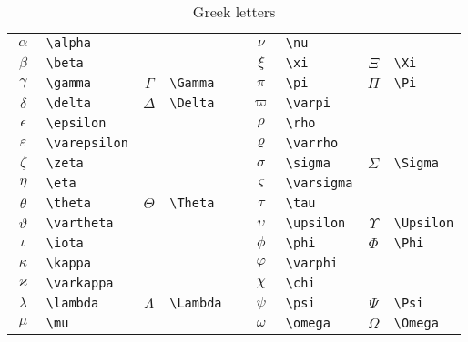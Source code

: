\documentclass[captions=tableheading]{scrartcl}
\begin{document}
\begin{table}
  \caption{Greek letters}
  \label{tab:greek-letters}
  \centering
  \begin{tabular}[c]{clclp{1pt}clcl}
    \toprule
    $\alpha$ & \verb|\alpha| & & & &
    $\nu$ & \verb|\nu| & & \\
    $\beta$ & \verb|\beta| & & & &
    $\xi$ & \verb|\xi| & $\Xi$ & \verb|\Xi| \\
    $\gamma$ & \verb|\gamma| & $\Gamma$ & \verb|\Gamma| & &
    $\pi$ & \verb|\pi| & $\Pi$ & \verb|\Pi| \\
    $\delta$ & \verb|\delta| & $\Delta$ & \verb|\Delta| & &
    $\varpi$ & \verb|\varpi| & & \\
    $\epsilon$ & \verb|\epsilon| & & & &
    $\rho$ & \verb|\rho| & & \\
    \addlinespace
    $\varepsilon$ & \verb|\varepsilon| & & & &
    $\varrho$ & \verb|\varrho| & & \\
    $\zeta$ & \verb|\zeta| & & & &
    $\sigma$ & \verb|\sigma| & $\Sigma$ & \verb|\Sigma| \\
    $\eta$ & \verb|\eta| & & & &
    $\varsigma$ & \verb|\varsigma| & & \\
    $\theta$ & \verb|\theta| & $\Theta$ & \verb|\Theta| & &
    $\tau$ & \verb|\tau| & & \\
    $\vartheta$ & \verb|\vartheta| & & & &
    $\upsilon$ & \verb|\upsilon| & $\Upsilon$ & \verb|\Upsilon| \\
    \addlinespace
    $\iota$ & \verb|\iota| & & & &
    $\phi$ & \verb|\phi| & $\Phi$ & \verb|\Phi| \\
    $\kappa$ & \verb|\kappa| & & & &
    $\varphi$ & \verb|\varphi| & & \\
    $\varkappa$ & \verb|\varkappa| & & & &
    $\chi$ & \verb|\chi| & & \\
    $\lambda$ & \verb|\lambda| & $\Lambda$ & \verb|\Lambda| & &
    $\psi$ & \verb|\psi| & $\Psi$ & \verb|\Psi| \\
    $\mu$ & \verb|\mu| & & & &
    $\omega$ & \verb|\omega| & $\Omega$ & \verb|\Omega| \\
    \bottomrule
  \end{tabular}
\end{table}
\end{document}
